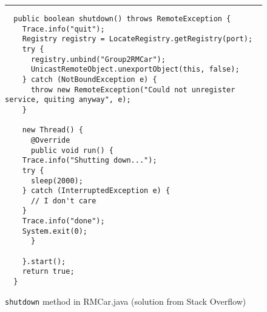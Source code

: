 \documentclass[12pt]{article}
\theoremstyle{plain}%
\theoremstyle{definition}
\theoremstyle{remark}
\newcommand{\java}[1]{{\lstinline!#1!}}
\newenvironment{figureone}[1]{%
  \def\deffigurecaption{#1}%
  \begin{figure}[htbp]%
  \begin{center}%
  \begin{minipage}{\columnwidth}%
  \hrule \vspace*{2ex}%
}{%
  \end{minipage}%
  \end{center}%
  \caption{\deffigurecaption}%
  \end{figure}%
}
\begin{document}
\begin{figureone}{\java{shutdown} method in RMCar.java (solution from Stack Overflow) \label{fig:shutdown}}
\begin{lstlisting}
  public boolean shutdown() throws RemoteException {
    Trace.info("quit");
    Registry registry = LocateRegistry.getRegistry(port);
    try {
      registry.unbind("Group2RMCar");
      UnicastRemoteObject.unexportObject(this, false);
    } catch (NotBoundException e) {
      throw new RemoteException("Could not unregister service, quiting anyway", e);
    }

    new Thread() {
      @Override
      public void run() {
	Trace.info("Shutting down...");
	try {
	  sleep(2000);
	} catch (InterruptedException e) {
	  // I don't care
	}
	Trace.info("done");
	System.exit(0);
      }

    }.start();
    return true;
  }
\end{lstlisting}
\end{figureone}







\end{document}
